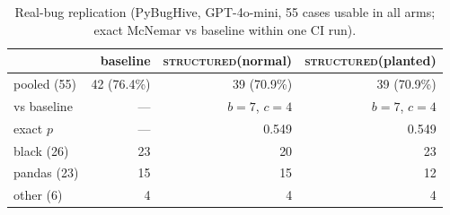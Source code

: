 \documentclass[10pt,conference,a4paper]{IEEEtran}
\newcommand{\structured}{\textsc{structured}\xspace}
\begin{document}
\begin{table}[t]
\caption{Real-bug replication (PyBugHive, GPT-4o-mini, 55 cases usable in
all arms; exact McNemar vs baseline within one CI run).}
\label{tab:powered}
\centering
\begin{tabular}{lrrr}
\toprule
 & baseline & \structured(normal) & \structured(planted) \\
\midrule
pooled (55) & 42 (76.4\%) & 39 (70.9\%) & 39 (70.9\%) \\
\quad vs baseline & --- & $b{=}7$, $c{=}4$ & $b{=}7$, $c{=}4$ \\
\quad exact $p$ & --- & 0.549 & 0.549 \\
\midrule
black (26) & 23 & 20 & 23 \\
pandas (23) & 15 & 15 & 12 \\
other (6) & 4 & 4 & 4 \\
\bottomrule
\end{tabular}
\end{table}
\end{document}
